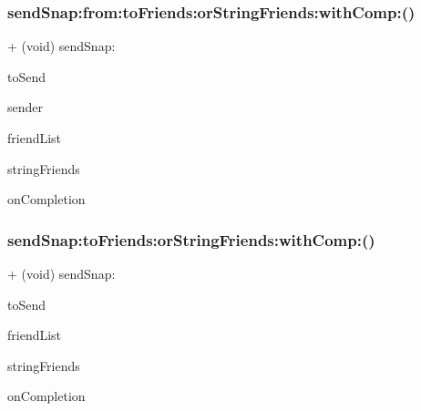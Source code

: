 \subsubsection{\texorpdfstring{send\+Snap\+:from\+:to\+Friends\+:or\+String\+Friends\+:with\+Comp\+:()}{sendSnap:from:toFriends:orStringFriends:withComp:()}}
{\footnotesize\ttfamily + (void) send\+Snap\+: \begin{DoxyParamCaption}\item[{(\hyperlink{interface_snap}{Snap} $\ast$)}]{to\+Send }\item[{from:(N\+S\+String $\ast$)}]{sender }\item[{toFriends:(N\+S\+Mutable\+Array$<$ \hyperlink{interface_friend}{Friend} $\ast$ $>$ $\ast$)}]{friend\+List }\item[{orStringFriends:(N\+S\+Mutable\+Array$<$ N\+S\+String $\ast$ $>$ $\ast$)}]{string\+Friends }\item[{withComp:(void($^\wedge$)(B\+O\+OL, id))}]{on\+Completion }\end{DoxyParamCaption}}

\hypertarget{interface_post_a0b8e17e3d30c10fd7bd134e6b3ef6a1a}{}\label{interface_post_a0b8e17e3d30c10fd7bd134e6b3ef6a1a} 
\subsubsection{\texorpdfstring{send\+Snap\+:to\+Friends\+:or\+String\+Friends\+:with\+Comp\+:()}{sendSnap:toFriends:orStringFriends:withComp:()}}
{\footnotesize\ttfamily + (void) send\+Snap\+: \begin{DoxyParamCaption}\item[{(\hyperlink{interface_snap}{Snap} $\ast$)}]{to\+Send }\item[{toFriends:(N\+S\+Mutable\+Array$<$ \hyperlink{interface_friend}{Friend} $\ast$ $>$ $\ast$)}]{friend\+List }\item[{orStringFriends:(N\+S\+Mutable\+Array$<$ N\+S\+String $\ast$ $>$ $\ast$)}]{string\+Friends }\item[{withComp:(void($^\wedge$)(B\+O\+OL, id))}]{on\+Completion }\end{DoxyParamCaption}}

\hypertarget{interface_post_a4465916d9360570eecc45ec5e4f3b405}{}\label{interface_post_a4465916d9360570eecc45ec5e4f3b405} 
